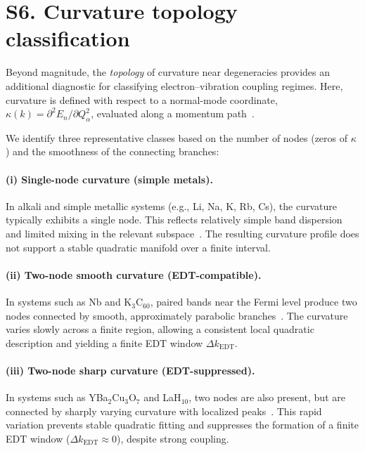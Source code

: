 \documentclass[12pt]{article}
\begin{document}
\section*{S6. Curvature topology classification}

Beyond magnitude, the \emph{topology} of curvature near degeneracies provides an additional diagnostic for classifying electron--vibration coupling regimes. Here, curvature is defined with respect to a normal-mode coordinate, $\kappa(k) = \partial^2 E_n / \partial Q_\alpha^2$, evaluated along a momentum path~\cite{Giustino2017,Yarkony1996}.

We identify three representative classes based on the number of nodes (zeros of $\kappa$) and the smoothness of the connecting branches:

\paragraph*{(i) Single-node curvature (simple metals).}
In alkali and simple metallic systems (e.g., Li, Na, K, Rb, Cs), the curvature typically exhibits a single node. This reflects relatively simple band dispersion and limited mixing in the relevant subspace~\cite{Kittel2004}. The resulting curvature profile does not support a stable quadratic manifold over a finite interval.

\paragraph*{(ii) Two-node smooth curvature (EDT-compatible).}
In systems such as Nb and K$_3$C$_{60}$, paired bands near the Fermi level produce two nodes connected by smooth, approximately parabolic branches~\cite{Gunnarsson1997,Capone2009}. The curvature varies slowly across a finite region, allowing a consistent local quadratic description and yielding a finite EDT window $\Delta k_{\mathrm{EDT}}$.

\paragraph*{(iii) Two-node sharp curvature (EDT-suppressed).}
In systems such as YBa$_2$Cu$_3$O$_7$ and LaH$_{10}$, two nodes are also present, but are connected by sharply varying curvature with localized peaks~\cite{Drozdov2019,Pickett1989}. This rapid variation prevents stable quadratic fitting and suppresses the formation of a finite EDT window ($\Delta k_{\mathrm{EDT}} \approx 0$), despite strong coupling.
\end{document}

